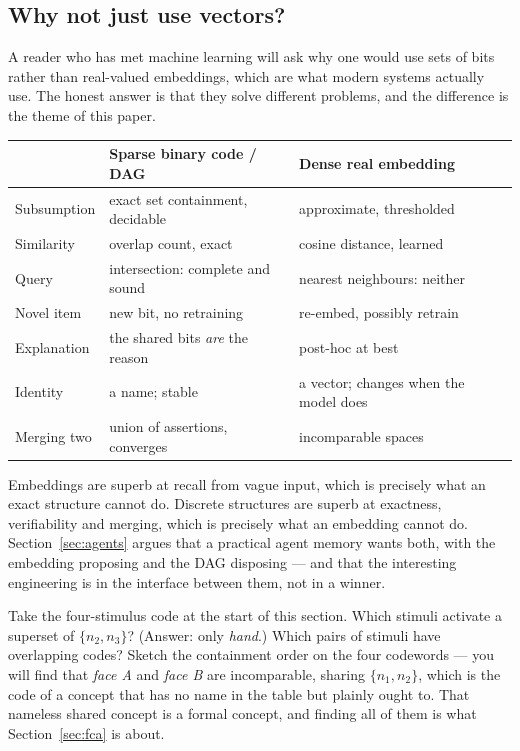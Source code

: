 \subsection{Why not just use vectors?}

A reader who has met machine learning will ask why one would use sets of bits
rather than real-valued embeddings, which are what modern systems actually
use. The honest answer is that they solve different problems, and the
difference is the theme of this paper.

\begin{center}
\small
\begin{tabularx}{\textwidth}{@{}lXX@{}}
\toprule
 & \textbf{Sparse binary code / DAG} & \textbf{Dense real embedding}\\
\midrule
Subsumption & exact set containment, decidable & approximate, thresholded\\
Similarity  & overlap count, exact & cosine distance, learned\\
Query       & intersection: complete and sound & nearest neighbours: neither\\
Novel item  & new bit, no retraining & re-embed, possibly retrain\\
Explanation & the shared bits \emph{are} the reason & post-hoc at best\\
Identity    & a name; stable & a vector; changes when the model does\\
Merging two & union of assertions, converges & incomparable spaces\\
\bottomrule
\end{tabularx}
\end{center}

Embeddings are superb at recall from vague input, which is precisely what an
exact structure cannot do. Discrete structures are superb at exactness,
verifiability and merging, which is precisely what an embedding cannot do.
Section~\ref{sec:agents} argues that a practical agent memory wants both, with
the embedding proposing and the DAG disposing --- and that the interesting
engineering is in the interface between them, not in a winner.

\begin{tryit}
Take the four-stimulus code at the start of this section. Which stimuli
activate a superset of $\{n_2, n_3\}$? (Answer: only \emph{hand}.) Which pairs
of stimuli have overlapping codes? Sketch the containment order on the four
codewords --- you will find that \emph{face A} and \emph{face B} are
incomparable, sharing $\{n_1, n_2\}$, which is the code of a concept that has
no name in the table but plainly ought to. That nameless shared concept is a
formal concept, and finding all of them is what Section~\ref{sec:fca} is
about.
\end{tryit}
